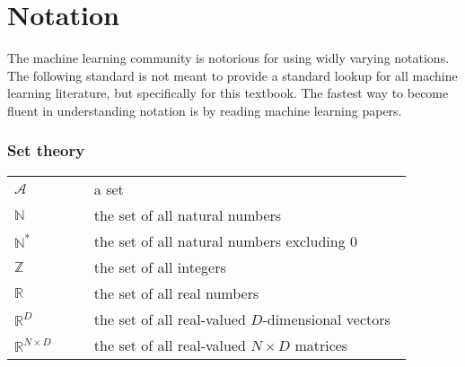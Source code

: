 \chapter*{Notation}
%

The machine learning community is notorious for using widly varying notations. The following standard is not meant to provide a standard lookup for all machine learning literature, but specifically for this textbook. The fastest way to become fluent in understanding notation is by reading machine learning papers.



\renewcommand{\arraystretch}{1.15}
\subsection*{Set theory}
\begin{tabular}{p{0.13\linewidth}p{0.07\linewidth}p{0.80\linewidth}}
  $\mathcal{A}$             &   & a set \\
  $\mathbb{N}$              &   & the set of all natural numbers \\
  $\mathbb{N}^*$            &   & the set of all natural numbers excluding 0 \\
  $\mathbb{Z}$              &   & the set of all integers \\
  $\mathbb{R}$              &   & the set of all real numbers \\
  $\mathbb{R}^D$            &   & the set of all real-valued $D$-dimensional vectors \\
  $\mathbb{R}^{N \times D}$ &   & the set of all real-valued $N \times D$ matrices \\
\end{tabular}


